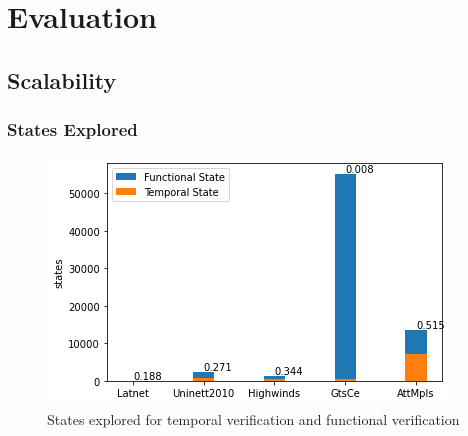\documentclass[10pt,sigconf,letterpaper,anonymous,nonacm]{acmart}
\begin{document}


\section{Evaluation}
\subsection{Scalability}

\subsubsection{States Explored}
\begin{figure}[h]
    \centering
    \includegraphics[scale=0.5]{states}
    \caption{States explored for temporal verification and functional verification}
    \label{fig:states}
\end{figure}
\end{document}
